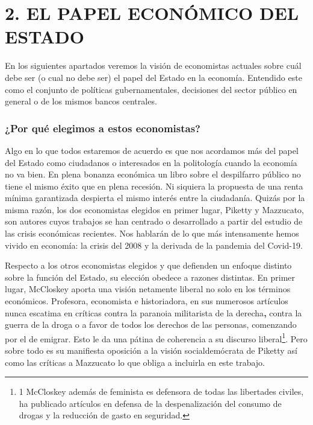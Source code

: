 \documentclass[
]{article}
\begin{document}
\hypertarget{el-papel-econuxf3mico-del-estado}{%
\section{2. EL PAPEL ECONÓMICO DEL
ESTADO}\label{el-papel-econuxf3mico-del-estado}}

En los siguientes apartados veremos la visión de economistas actuales
sobre cuál debe ser (o cual no debe ser) el papel del Estado en la
economía. Entendido este como el conjunto de políticas gubernamentales,
decisiones del sector público en general o de los mismos bancos
centrales.

\hypertarget{por-quuxe9-elegimos-a-estos-economistas}{%
\subsubsection{¿Por qué elegimos a estos
economistas?}\label{por-quuxe9-elegimos-a-estos-economistas}}

Algo en lo que todos estaremos de acuerdo es que nos acordamos más del
papel del Estado como ciudadanos o interesados en la politología cuando
la economía no va bien. En plena bonanza económica un libro sobre el
despilfarro público no tiene el mismo éxito que en plena recesión. Ni
siquiera la propuesta de una renta mínima garantizada despierta el mismo
interés entre la ciudadanía. Quizás por la misma razón, los dos
economistas elegidos en primer lugar, Piketty y Mazzucato, son autores
cuyos trabajos se han centrado o desarrollado a partir del estudio de
las crisis económicas recientes. Nos hablarán de lo que más intensamente
hemos vivido en economía: la crisis del 2008 y la derivada de la
pandemia del Covid-19.

Respecto a los otros economistas elegidos y que defienden un enfoque
distinto sobre la función del Estado, su elección obedece a razones
distintas. En primer lugar, McCloskey aporta una visión netamente
liberal no solo en los términos económicos. Profesora, economista e
historiadora, en sus numerosos artículos nunca escatima en críticas
contra la paranoia militarista de la derecha\textbf{,} contra la guerra
de la droga o a favor de todos los derechos de las personas, comenzando
por el de emigrar. Esto le da una pátina de coherencia a su discurso
liberal\footnote{1 McCloskey además de feminista es defensora de todas
  las libertades civiles, ha publicado artículos en defensa de la
  despenalización del consumo de drogas y la reducción de gasto en
  seguridad.}. Pero sobre todo es su manifiesta oposición a la visión
socialdemócrata de Piketty así como las críticas a Mazzucato lo que
obliga a incluirla en este trabajo.
\end{document}
